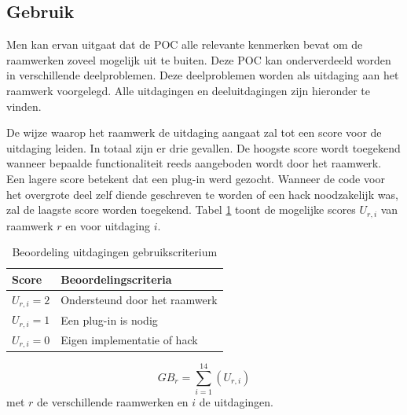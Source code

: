 \subsection{Gebruik}
\label{sec:vergelijking-gebruik}

Men kan ervan uitgaat dat de POC alle relevante kenmerken bevat om de raamwerken zoveel mogelijk uit te buiten. 
Deze POC kan onderverdeeld worden in verschillende deelproblemen.
Deze deelproblemen worden als uitdaging aan het raamwerk voorgelegd.
Alle uitdagingen en deeluitdagingen zijn hieronder te vinden.

{}

De wijze waarop het raamwerk de uitdaging aangaat zal tot een score voor de uitdaging leiden.
In totaal zijn er drie gevallen.
De hoogste score wordt toegekend wanneer bepaalde functionaliteit reeds aangeboden wordt door het raamwerk. 
Een lagere score betekent dat een plug-in werd gezocht. 
Wanneer de code voor het overgrote deel zelf diende geschreven te worden of een hack noodzakelijk was, zal de laagste score worden toegekend.
Tabel \ref{tabel:scores-uitdagingen} toont de mogelijke scores $U_{r,i}$ van raamwerk $r$ en voor uitdaging $i$.
\begin{table}[h]	
  \centering
  \begin{tabular}{ll}
    \toprule
    \textbf{Score} & \textbf{Beoordelingscriteria}\\
    \midrule
    $U_{r,i} = 2$ & Ondersteund door het raamwerk\\
    $U_{r,i} = 1$ & Een plug-in is nodig\\
    $U_{r,i} = 0$ & Eigen implementatie of hack\\
    \bottomrule
  \end{tabular}
  \caption{Beoordeling uitdagingen gebruikscriterium}
  \label{tabel:scores-uitdagingen}
\end{table}
\begin{equation}
  GB_r = \sum_{i=1}^{14}{\left(U_{r,i}\right)}
  \label{eq:gebruik}
\end{equation}
met $r$ de verschillende raamwerken en $i$ de uitdagingen.
